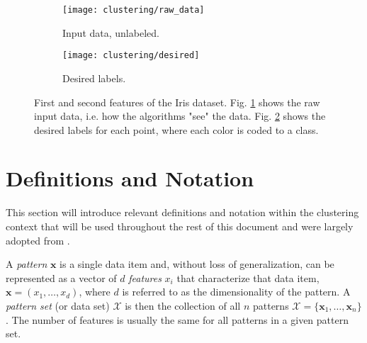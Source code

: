 
\begin{figure}[!ht]
    \centering
    \begin{subfigure}[b]{0.45\textwidth}
        \centering
        \texttt{[image: clustering/raw\_data]}
        \caption{Input data, unlabeled.}
        \label{fig:intro raw}
    \end{subfigure}
    \begin{subfigure}[b]{0.45\textwidth}
        \centering
        \texttt{[image: clustering/desired]}
        \caption{Desired labels.}
        \label{fig:intro natural}
    \end{subfigure}

    \caption{First and second features of the Iris dataset. Fig. \ref{fig:intro raw} shows the raw input data, i.e. how the algorithms "see" the data. Fig. \ref{fig:intro natural} shows the desired labels for each point, where each color is coded to a class.}
    \label{fig:clustering plots}
\end{figure}


\section{Definitions and Notation}
\label{sec:definitions and notation}

This section will introduce relevant definitions and notation within the clustering context that will be used throughout the rest of this document and were largely adopted from \cite{Jain1999}.

A \emph{pattern} $\mathbf{x}$ is a single data item and, without loss of generalization, can be represented as a vector of $d$ \emph{features} $x_i$ that characterize that data item, $\mathbf{x} = (x_1, \ldots, x_d)$, where $d$ is referred to as the dimensionality of the pattern.
A \emph{pattern set} (or data set) $\mathcal{X}$ is then the collection of all $n$ patterns $\mathcal{X} = \{ \mathbf{x}_1, \ldots, \mathbf{x}_n \}$.
The number of features is usually the same for all patterns in a given pattern set.

